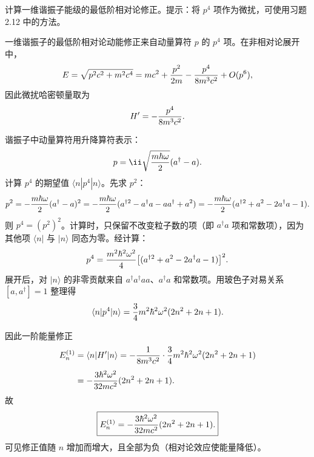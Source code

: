\begin{question}
计算一维谐振子能级的最低阶相对论修正。提示：将 $p^4$ 项作为微扰，可使用习题 2.12 中的方法。
\end{question}
\begin{solution}
一维谐振子的最低阶相对论动能修正来自动量算符 $p$ 的 $p^4$ 项。在非相对论展开中，
\[
E=\sqrt{p^2c^2+m^2c^4}=mc^2+{p^2\over2m}-{p^4\over8m^3c^2}+O(p^6),
\]
因此微扰哈密顿量取为
\[
H'=-{p^4\over8m^3c^2}.
\]

谐振子中动量算符用升降算符表示：
\[
p=\ii\sqrt{m\hbar\omega\over2}(a^\dagger-a).
\]
计算 $p^4$ 的期望值 $\langle n|p^4|n\rangle$。先求 $p^2$：
\[
p^2=-{m\hbar\omega\over2}(a^\dagger-a)^2
=-{m\hbar\omega\over2}(a^{\dagger2}-a^\dagger a-a a^\dagger+a^2)
=-{m\hbar\omega\over2}(a^{\dagger2}+a^2-2a^\dagger a-1).
\]
则 $p^4=(p^2)^2$。计算时，只保留不改变粒子数的项（即 $a^\dagger a$ 项和常数项），因为其他项 $\langle n|$ 与 $|n\rangle$ 同态为零。经计算：
\[
p^4={m^2\hbar^2\omega^2\over4}\bigl[(a^{\dagger2}+a^2-2a^\dagger a-1)\bigr]^2.
\]
展开后，对 $|n\rangle$ 的非零贡献来自 $a^\dagger a^\dagger a a$、$a^\dagger a$ 和常数项。用玻色子对易关系 $[a,a^\dagger]=1$ 整理得
\[
\langle n|p^4|n\rangle={3\over4}m^2\hbar^2\omega^2(2n^2+2n+1).
\]

因此一阶能量修正
\[
\begin{aligned}
E_n^{(1)}&=\langle n|H'|n\rangle
=-{1\over8m^3c^2}\cdot{3\over4}m^2\hbar^2\omega^2(2n^2+2n+1)\\[4pt]
&=-{3\hbar^2\omega^2\over32mc^2}(2n^2+2n+1).
\end{aligned}
\]
故
\[
\boxed{E_n^{(1)}=-{3\hbar^2\omega^2\over32mc^2}(2n^2+2n+1).}
\]
可见修正值随 $n$ 增加而增大，且全部为负（相对论效应使能量降低）。
\end{solution}


